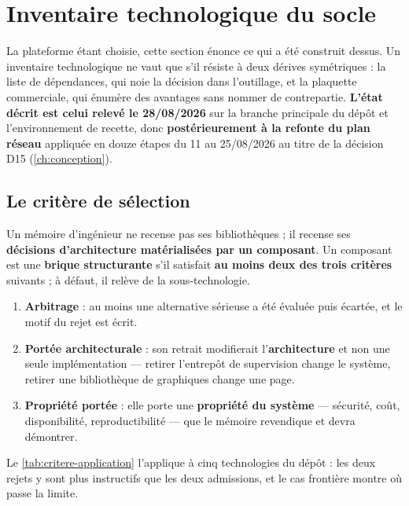 \section{Inventaire technologique du socle}
\label{sec:inventaire}

La plateforme étant choisie, cette section énonce ce qui a été construit dessus. Un inventaire
technologique ne vaut que s'il résiste à deux dérives symétriques : la liste de dépendances, qui
noie la décision dans l'outillage, et la plaquette commerciale, qui énumère des avantages sans
nommer de contrepartie. \textbf{L'état décrit est celui relevé le 28/08/2026} sur la branche
principale du dépôt et l'environnement de recette, donc \textbf{postérieurement à la refonte du
plan réseau} appliquée en douze étapes du 11 au 25/08/2026 au titre de la décision D15
(\cref{ch:conception}).

\subsection{Le critère de sélection}
\label{sec:critere-selection}

Un mémoire d'ingénieur ne recense pas ses bibliothèques ; il recense ses \textbf{décisions
d'architecture matérialisées par un composant}. Un composant est une \textbf{brique structurante}
s'il satisfait \textbf{au moins deux des trois critères} suivants ; à défaut, il relève de la
sous-technologie.

\begin{enumerate}\setlength{\itemsep}{0pt}\setlength{\parskip}{0pt}
  \item \textbf{Arbitrage} : au moins une alternative sérieuse a été évaluée puis écartée, et le
  motif du rejet est écrit.
  \item \textbf{Portée architecturale} : son retrait modifierait l'\textbf{architecture} et non
  une seule implémentation --- retirer l'entrepôt de supervision change le système, retirer une
  bibliothèque de graphiques change une page.
  \item \textbf{Propriété portée} : elle porte une \textbf{propriété du système} --- sécurité,
  coût, disponibilité, reproductibilité --- que le mémoire revendique et devra démontrer.
\end{enumerate}

Le \cref{tab:critere-application} l'applique à cinq technologies du dépôt : les deux rejets y
sont plus instructifs que les deux admissions, et le cas frontière montre où passe la limite.

